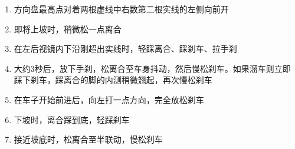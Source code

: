 \begin{enumerate}
    \item 方向盘最高点对着两根虚线中右数第二根实线的左侧向前开
    \item 即将上坡时，稍微松一点离合
    \item 在左后视镜内下沿刚超出实线时，轻踩离合、踩刹车、拉手刹
    \item 大约3秒后，放下手刹，松离合至车身抖动，然后慢松刹车。如果溜车则立即踩下刹车，踩离合的脚的内测稍微翘起，再次慢松刹车
    \item 在车子开始前进后，向左打一点方向，完全放松刹车
    \item 下坡时，离合踩到底，轻踩刹车
    \item 接近坡底时，松离合至半联动，慢松刹车
\end{enumerate}